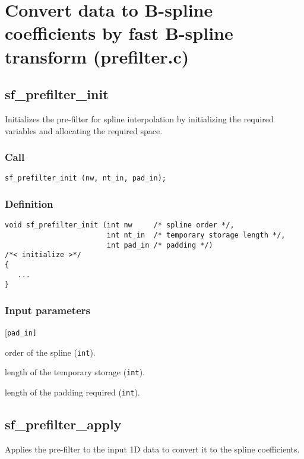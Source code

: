 \section{Convert data to B-spline coefficients by fast B-spline transform (prefilter.c)}




\subsection{{sf\_prefilter\_init}}\label{sec:sf_prefilter_init}
Initializes the pre-filter for spline interpolation by initializing the required variables and allocating the required space.

\subsubsection*{Call}
\begin{verbatim}sf_prefilter_init (nw, nt_in, pad_in);\end{verbatim}

\subsubsection*{Definition}
\begin{verbatim}
void sf_prefilter_init (int nw     /* spline order */, 
                        int nt_in  /* temporary storage length */, 
                        int pad_in /* padding */)
/*< initialize >*/
{
   ...
}
\end{verbatim}

\subsubsection*{Input parameters}
\begin{desclist}{\tt }{\quad}[\tt pad\_in]
   \setlength\itemsep{0pt}
   \item[nw]      order of the spline (\texttt{int}). 
   \item[nt\_in]  length of the temporary storage (\texttt{int}). 
   \item[pad\_in] length of the padding required (\texttt{int}).  
\end{desclist}




\subsection{{sf\_prefilter\_apply}}
Applies the pre-filter to the input 1D data to convert it to the spline coefficients.

